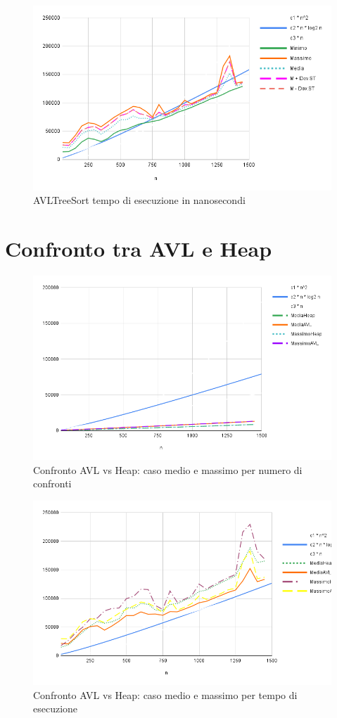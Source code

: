 \documentclass{article}
\begin{document}
\begin{figure}[H]
    \centering
    \includegraphics[width=0.95\linewidth]{Grafici/AVLTreeSortTempNs.png}
    \caption{AVLTreeSort tempo di esecuzione in nanosecondi}
    \label{fig:avl_tempo}
\end{figure}

\newpage

\section*{Confronto tra AVL e Heap}
\begin{figure}[H]
    \centering
    \includegraphics[width=0.95\linewidth]{Grafici/AVLvsHEApNc.png}
    \caption{Confronto AVL vs Heap: caso medio e massimo per numero di confronti}
    \label{fig:confronto_nc}
\end{figure}

\begin{figure}[H]
    \centering
    \includegraphics[width=0.95\linewidth]{Grafici/AVLvsHeapTs.png}
    \caption{Confronto AVL vs Heap: caso medio e massimo per tempo di esecuzione}
    \label{fig:confronto_ts}
\end{figure}
\end{document}
